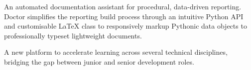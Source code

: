 \begin{Page}
\begin{Slides}
		An automated documentation assistant for procedural, data-driven reporting. Doctor simplifies the reporting build process through an intuitive Python API and customisable \LaTeX{} class to responsively markup Pythonic data objects to professionally typeset lightweight documents.%
		
		\Spacer[height=\nlmargin]%
		
		\Author[%
			name={ons.dev},
			team={Elliott Phillips, Data Scientist},
			image=img/ep.jpg,
			image width=1,
		]%
		
		A new platform to accelerate learning across several technical disciplines, bridging the gap between junior and senior development roles.%
	\end{Slides}
\end{Page}